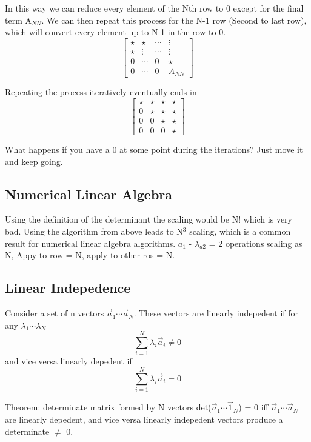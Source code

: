 \documentclass{article}
\newcommand{\be}{\begin{equation}}
\newcommand{\ee}{\end{equation}}
\begin{document}
In this way we can reduce every element of the Nth row to 0 except for the final term A$_{NN}$.
We can then repeat this process for the N-1 row (Second to last row), which will convert every element up to N-1 in the row to 0.%
\be
\begin{bmatrix}
    \star  & \star & \dotsb & \vdots \\
    \star & \vdots &\dotsb &  \vdots \\
    0 & \dotsb &  0 &  \star \\
    0  & \dotsb & 0 &  A_{NN} 
\end{bmatrix}
\ee

Repeating the process iteratively eventually ends in
\be
\begin{bmatrix}
    \star  & \star & \star & \star \\
     0 & \star &\star &  \star \\
     0 & 0 &  \star &  \star \\
    0  & 0 & 0 &  \star 
\end{bmatrix}
\ee

What happens if you have a 0 at some point during the iterations? Just move it and keep going. 

\subsection{Numerical Linear Algebra}
Using the definition of the determinant the scaling would be N! which is very bad. 
Using the algorithm from above leads to N$^3$ scaling, which is a common result for numerical linear algebra algorithms.
$a_1$ - $\lambda_{a2}$ = 2 operations scaling as N, Appy to row = N, apply to other ros = N. 

\subsection{Linear Indepedence}
Consider a set of n vectors $\vec{a}_1 \cdots \vec{a}_N$. 
These vectors are linearly indepedent if for any $\lambda_1\cdots\lambda_N$
\be
\sum_{i=1}^N \lambda_i\vec{a}_i \neq 0
\ee
and vice versa linearly depedent if 
\be
\sum_{i=1}^N \lambda_i\vec{a}_i = 0
\ee

Theorem: determinate matrix formed by N vectors det($\vec{a}_1\cdots\vec{1}_N$) = 0 iff $\vec{a}_1\cdots\vec{a}_N$ are linearly depedent, and vice versa linearly indepedent vectors produce a determinate $\neq$ 0. 
\end{document}
